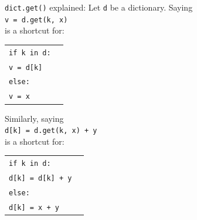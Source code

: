 \documentclass[t,handout,9pt]{beamer}
\begin{document}
\begin{frame}
\vfill
\texttt{dict.get()} explained:
\vfill
Let \texttt{d} be a dictionary. Saying\\
\texttt{v = d.get(k, x)}\\
is a shortcut for:
\begin{table}[]
\begin{flushleft}
\begin{tabular}{ll}
\texttt{if k in d:} &   \\
\texttt{\qquad v = d[k]} &   \\
\texttt{else:} &  \\
\texttt{\qquad v = x} &   \\
\end{tabular}
\end{flushleft}
\end{table}
\vfill
Similarly, saying\\
\texttt{d[k] = d.get(k, x) + y}\\
is a shortcut for:
\begin{table}[]
\begin{flushleft}
\begin{tabular}{ll}
\texttt{if k in d:} &   \\
\texttt{\qquad d[k] = d[k] + y} &   \\
\texttt{else:} &  \\
\texttt{\qquad d[k] = x + y} &   \\
\end{tabular}
\end{flushleft}
\end{table}
\vfill
\end{frame}
%
\end{document}
